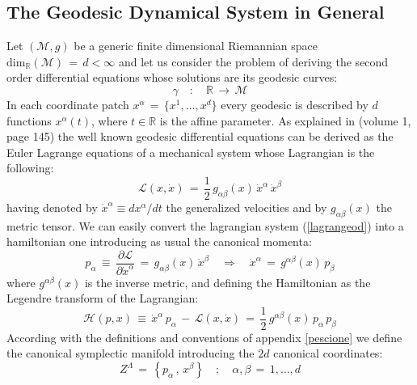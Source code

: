 \documentclass[10pt,a4paper]{article}
\newcommand{\ft}[2]{{\textstyle\frac{#1}{#2}}}
\begin{document}
\subsection{The Geodesic Dynamical System in General}
\label{gengeodynsys}
Let $(\mathcal{M},g)$ be a generic finite dimensional Riemannian space $\mathrm{dim}_\mathbb{R}(\mathcal{M}) \,=\, d < \infty$ and let us consider the problem of deriving the second order differential equations whose solutions are its geodesic curves:
\begin{equation}\label{geocurvina}
\gamma \quad : \quad  \mathbb{R}\, \longrightarrow \, \mathcal{M}
\end{equation}
In each coordinate patch $x^\alpha \, = \, \{x^1,\dots , x^d\}$ every geodesic is described by $d$ functions $x^\alpha(t)$, where $t\in \mathbb{R}$ is the affine parameter. As explained in \cite{pietrobook} (volume 1, page 145) the well known geodesic differential equations can be derived as the Euler Lagrange equations of a mechanical system whose Lagrangian is the following:
\begin{equation}\label{lagrangeod}
  \mathcal{L}(x,\dot{x}) \, = \, \ft 12 \, g_{\alpha\beta}(x) \,
  \dot{x}^\alpha \, \dot{x}^\beta
\end{equation}
having denoted by $\dot{x}^\alpha \equiv d{x}^\alpha/dt$ the generalized velocities and by $g_{\alpha\beta}(x)$ the metric tensor. We can easily convert the lagrangian system (\ref{lagrangeod}) into a hamiltonian one introducing as usual the canonical momenta:
\begin{equation}\label{canmoment}
  p_\alpha \, \equiv \, \frac{\partial \mathcal{L}}{\partial \dot{x}^\alpha} \, = \, g_{\alpha\beta}(x) \, \dot{x}^\beta
  \quad \Rightarrow \quad \dot{x}^\alpha \, = \, g^{\alpha\beta}(x) \, p_\beta
\end{equation}
where $g^{\alpha\beta}(x)$ is the inverse metric, and defining the Hamiltonian as the Legendre transform of the Lagrangian:
\begin{equation}\label{hamillaregia}
  \mathcal{H}(p,x) \, \equiv \, \dot{x}^\alpha \, p_\alpha \,  - \,
  \mathcal{L}(x,\dot{x}) \, = \, \ft 12 \, g^{\alpha\beta}(x) \,
  p_\alpha \, p_\beta
\end{equation}
According with the definitions and conventions of appendix \ref{pescione} we define the canonical symplectic manifold introducing the $2d$ canonical coordinates:
\begin{equation}\label{cannonicordi}
  Z^\Lambda \, = \,\left\{p_\alpha \, , \, x^\beta \right\} \quad; \quad \alpha,\beta\, = \,1, \dots,d
\end{equation}
\end{document}
